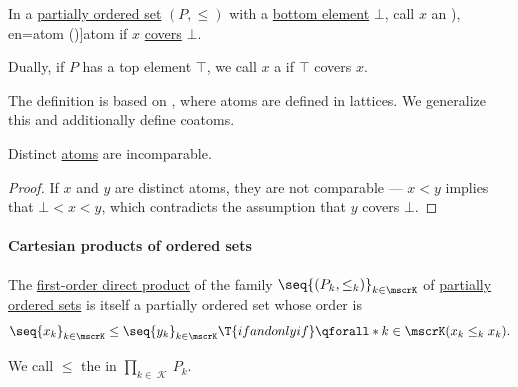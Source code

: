 \begin{definition}\label{def:partial_order_atom}\mimprovised
  In a \hyperref[def:partially_ordered_set]{partially ordered set} \( (P, \leq) \) with a \hyperref[def:extremal_points/top_and_bottom]{bottom element} \( \bot \), call \( x \) an \term[ru=атом (\cite[89]{Гуров2013ТеорияРешёток}), en=atom (\cite[113]{DaveyPriestley2002LatticeTheory})]{atom} if \( x \) \hyperref[def:partial_order_covering]{covers} \( \bot \).

  Dually, if \( P \) has a top element \( \top \), we call \( x \) a  if \( \top \) covers \( x \).
\end{definition}
\begin{comments}
  \item The definition is based on \cite[113]{DaveyPriestley2002LatticeTheory}, where atoms are defined in lattices. We generalize this and additionally define coatoms.
\end{comments}

\begin{proposition}\label{thm:atoms_are_incomparable}
  Distinct \hyperref[def:partial_order_atom]{atoms} are incomparable.
\end{proposition}
\begin{proof}
  If \( x \) and \( y \) are distinct atoms, they are not comparable --- \( x < y \) implies that \( \bot < x < y \), which contradicts the assumption that \( y \) covers \( \bot \).
\end{proof}

\paragraph{Cartesian products of ordered sets}

\begin{definition}\label{def:product_order}
  The \hyperref[def:fol_direct_product]{first-order direct product} of the family \( \seq{ (P_k, \leq_k) }_{k \in \mscrK} \) of \hyperref[def:partially_ordered_set]{partially ordered sets} is itself a partially ordered set whose order is
  \begin{equation*}
    \seq{ x_k }_{k \in \mscrK} \leq \seq{ y_k }_{k \in \mscrK} \T{if and only if} \qforall* {k \in \mscrK} {(x_k \leq_k x_k)}.
  \end{equation*}

  We call \( {\leq} \) the  in \( \prod_{k \in \mscrK} P_k \).
\end{definition}

